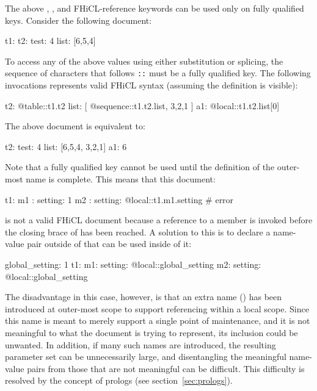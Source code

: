 \documentclass{memarticle}
\makeatletter
\newcommand{\atlocal}{\fclcode{@local::}\xspace}
\newcommand{\atsequence}{\fclcode{@sequence::}\xspace}
\newcommand{\attable}{\fclcode{@table::}\xspace}
\makeatother
\begin{document}
The above \atlocal, \attable, and \atsequence FHiCL-reference keywords
can be used only on fully qualified keys.  Consider the following
document:
%
\Needspace{0.34in}
\begin{fcllisting}[texcl,escapechar=`]
t1: {
   t2: {
      test: 4
      list: [6,5,4]
   }
}
\end{fcllisting}
%
To access any of the above values using either substitution or
splicing, the sequence of characters that follows \verb|::| must be a
fully qualified key.  The following invocations represents valid FHiCL
syntax (assuming the  definition is visible):
%
\Needspace{0.34in}
\begin{fcllisting}[texcl,escapechar=`]
t2: {
   @table::t1.t2
   list: [ @sequence::t1.t2.list, 3,2,1 ]
}
a1: @local::t1.t2.list[0]
\end{fcllisting}
%
The above document is equivalent to:
%
\Needspace{0.34in}
\begin{fcllisting}[texcl,escapechar=`]
t2: {
   test: 4
   list: [6,5,4, 3,2,1]
}
a1: 6
\end{fcllisting}
%

Note that a fully qualified key cannot be used until the definition of
the outer-most name is complete.  This means that this document:
%
\Needspace{0.34in}
\begin{fcllisting}[texcl,escapechar=`]
t1: {
   m1 : { setting: 1 }
   m2 : { setting: @local::t1.m1.setting }  # error
}
\end{fcllisting}
%
is not a valid FHiCL document because a reference to a 
member is invoked before the closing brace of  has been
reached.  A solution to this is to declare a name-value pair outside
of  that can be used inside of it:
%
\Needspace{0.34in}
\begin{fcllisting}[texcl,escapechar=`]
global_setting: 1
t1: {
   m1: { setting: @local::global_setting }
   m2: { setting: @local::global_setting }
}
\end{fcllisting}
%
The disadvantage in this case, however, is that an extra name
() has been introduced at outer-most scope to
support referencing within a local scope.  Since this name is meant to
merely support a single point of maintenance, and it is not meaningful
to what the document is trying to represent, its inclusion could be
unwanted.  In addition, if many such names are introduced, the
resulting parameter set can be unnecessarily large, and disentangling
the meaningful name-value pairs from those that are not meaningful can
be difficult.  This difficulty is resolved by the concept of prologs
(see section~\ref{sec:prologs}).
\end{document}
